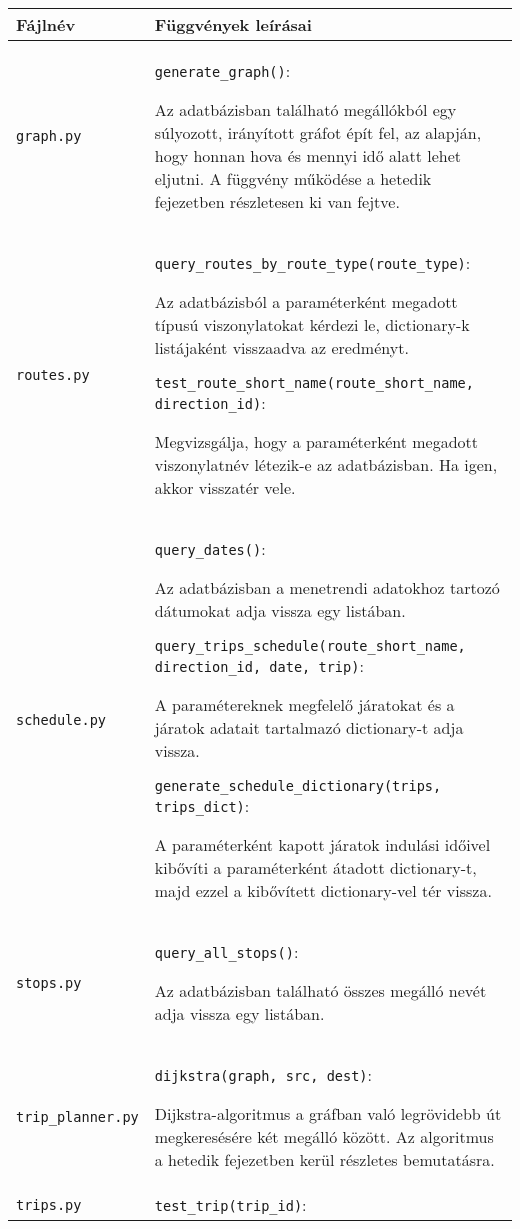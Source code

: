 \begin{longtable}{|p{4.5cm}|p{9cm}|}
\hline
\textbf{Fájlnév} & \textbf{Függvények leírásai} \\
\hline
\texttt{graph.py} &
\texttt{generate\_graph()}:

Az adatbázisban található megállókból egy súlyozott, irányított gráfot épít fel, az alapján, hogy honnan hova és mennyi idő alatt lehet eljutni. A függvény működése a hetedik fejezetben részletesen ki van fejtve.
\\
\hline
\texttt{routes.py} &
\texttt{query\_routes\_by\_route\_type(route\_type)}:

Az adatbázisból a paraméterként megadott típusú viszonylatokat kérdezi le, dictionary-k listájaként visszaadva az eredményt.

\bigskip

\texttt{test\_route\_short\_name(route\_short\_name, direction\_id)}:

Megvizsgálja, hogy a paraméterként megadott viszonylatnév létezik-e az adatbázisban. Ha igen, akkor visszatér vele.
\\
\hline
\texttt{schedule.py} &
\texttt{query\_dates()}:

Az adatbázisban a menetrendi adatokhoz tartozó dátumokat adja vissza egy listában.

\bigskip

\texttt{query\_trips\_schedule(route\_short\_name, direction\_id, date, trip)}:

A paramétereknek megfelelő járatokat és a járatok adatait tartalmazó dictionary-t adja vissza.

\bigskip

\texttt{generate\_schedule\_dictionary(trips, trips\_dict)}:

A paraméterként kapott járatok indulási időivel kibővíti a paraméterként átadott dictionary-t, majd ezzel a kibővített dictionary-vel tér vissza.
\\
\hline
\texttt{stops.py} &
\texttt{query\_all\_stops()}:

Az adatbázisban található összes megálló nevét adja vissza egy listában.
\\
\hline
\texttt{trip\_planner.py} &
\texttt{dijkstra(graph, src, dest)}:

Dijkstra-algoritmus a gráfban való legrövidebb út megkeresésére két megálló között. Az algoritmus a hetedik fejezetben kerül részletes bemutatásra.
\\
\hline
\texttt{trips.py} &
\texttt{test\_trip(trip\_id)}:


\end{longtable}

